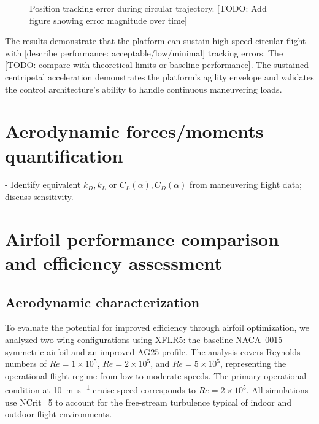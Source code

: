\begin{figure}[htbp]
  \centering
  \caption{Position tracking error during circular trajectory. [TODO: Add figure showing error magnitude over time]}
  \label{fig:circle_tracking_error}
\end{figure}

The results demonstrate that the platform can sustain high-speed circular flight with [describe performance: acceptable/low/minimal] tracking errors. The [TODO: compare with theoretical limits or baseline performance]. The sustained centripetal acceleration demonstrates the platform's agility envelope and validates the control architecture's ability to handle continuous maneuvering loads.

\section{Aerodynamic forces/moments quantification}
- Identify equivalent $k_D,k_L$ or $C_L(\alpha), C_D(\alpha)$ from maneuvering flight data; discuss sensitivity.

\section{Airfoil performance comparison and efficiency assessment}
\label{sec:airfoil_comparison}

\subsection{Aerodynamic characterization}

To evaluate the potential for improved efficiency through airfoil optimization, we analyzed two wing configurations using XFLR5: the baseline NACA~0015 symmetric airfoil and an improved AG25 profile.
The analysis covers Reynolds numbers of $Re=1\times10^5$, $Re=2\times10^5$, and $Re=5\times10^5$, representing the operational flight regime from low to moderate speeds.
The primary operational condition at \SI{10}{\meter\per\second} cruise speed corresponds to $Re=2\times10^5$.
All simulations use NCrit=5 to account for the free-stream turbulence typical of indoor and outdoor flight environments.


